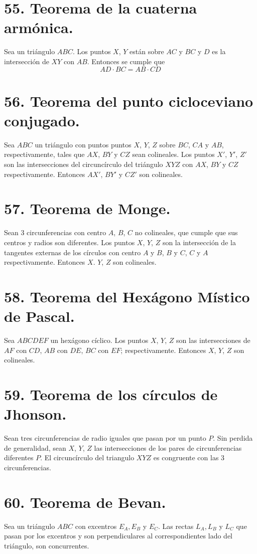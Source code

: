 \documentclass[12pt,a4paper, oneside]{book}
\begin{document}
\section{55. Teorema de la cuaterna armónica.}
Sea un triángulo $ABC$. Los puntos $X$, $Y$ están sobre ${AC}$ y ${BC}$ y $D$ es la intersección de $XY$ con $AB$. Entonces se cumple que $$AD \cdot BC= AB \cdot CD$$

\section{56. Teorema del punto cicloceviano conjugado.}
Sea $ABC$ un triángulo con puntos puntos $X$, $Y$, $Z$ sobre ${BC}$, ${CA}$ y ${AB}$, respectivamente, tales que $AX$, $BY$ y $CZ$ sean colineales. Los puntos $X'$, $Y'$, $Z'$ son las intersecciones del circuncírculo del triángulo $XYZ$ con $AX$, $BY$ y $CZ$ respectivamente. Entonces $AX'$, $BY'$ y $CZ'$ son colineales.
\section{57. Teorema de Monge.}
Sean 3 circunferencias con centro $A$, $B$, $C$ no colineales, que cumple que sus centros y radios son diferentes. Los puntos $X$, $Y$, $Z$ son la intersección de la tangentes externas de los círculos con centro $A$ y $B$, $B$ y $C$, $C$ y $A$ respectivamente. Entonces $X$. $Y$, $Z$ son colineales. 
\section{58. Teorema del Hexágono Místico de Pascal.}
Sea $ABCDEF$ un hexágono cíclico. Los puntos $X$, $Y$, $Z$ son las intersecciones de $AF$ con $CD$, $AB$ con $DE$, $BC$ con $EF$; respectivamente. Entonces $X$, $Y$, $Z$ son colineales.
\section{59. Teorema de los círculos de Jhonson.}
Sean tres circunferencias de radio iguales que pasan por un punto $P$. Sin perdida de generalidad, sean $X$, $Y$, $Z$ las intersecciones de los pares de circunferencias diferentes $P$. El circuncírculo del triangulo $XYZ$ es congruente con las 3 circunferencias.
\section{60. Teorema de Bevan.}
Sea un triángulo $ABC$ con excentros $E_A, E_B$ y $E_C$. Las rectas $L_A, L_B$ y $L_C$ que pasan por los excentros y son perpendiculares al correspondientes lado del triángulo, son concurrentes.
\end{document}
